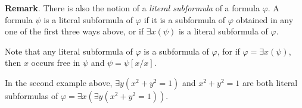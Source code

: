 \documentclass[12pt]{article}
\begin{document}
\textbf{Remark}.  There is also the notion of a \emph{literal subformula} of a formula $\varphi$.  A formula $\psi$ is a literal subformula of $\varphi$ if it is a subformula of $\varphi$ obtained in any one of the first three ways above, or if $\exists x (\psi)$ is a literal subformula of $\varphi$.

Note that any literal subformula of $\varphi$ is a subformula of $\varphi$, for if $\varphi=\exists x (\psi)$, then $x$ occurs free in $\psi$ and $\psi=\psi[x/x]$.

In the second example above, $\exists y (x^2+y^2=1)$ and $x^2+y^2=1$ are both literal subformulas of $\varphi=\exists x (\exists y (x^2+y^2=1))$.

\end{document}
